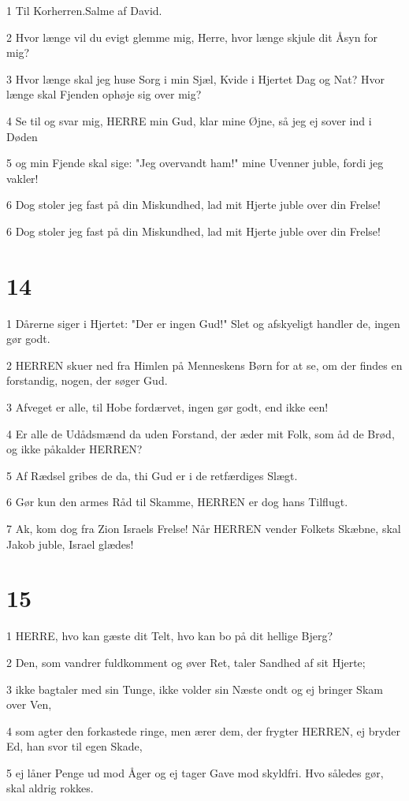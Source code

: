 \par 1 Til Korherren.Salme af David.
\par 2 Hvor længe vil du evigt glemme mig, Herre, hvor længe skjule dit Åsyn for mig?
\par 3 Hvor længe skal jeg huse Sorg i min Sjæl, Kvide i Hjertet Dag og Nat? Hvor længe skal Fjenden ophøje sig over mig?
\par 4 Se til og svar mig, HERRE min Gud, klar mine Øjne, så jeg ej sover ind i Døden
\par 5 og min Fjende skal sige: "Jeg overvandt ham!" mine Uvenner juble, fordi jeg vakler!
\par 6 Dog stoler jeg fast på din Miskundhed, lad mit Hjerte juble over din Frelse!
\par 6 Dog stoler jeg fast på din Miskundhed, lad mit Hjerte juble over din Frelse!

\chapter{14}

\par 1 Dårerne siger i Hjertet: "Der er ingen Gud!" Slet og afskyeligt handler de, ingen gør godt.
\par 2 HERREN skuer ned fra Himlen på Menneskens Børn for at se, om der findes en forstandig, nogen, der søger Gud.
\par 3 Afveget er alle, til Hobe fordærvet, ingen gør godt, end ikke een!
\par 4 Er alle de Udådsmænd da uden Forstand, der æder mit Folk, som åd de Brød, og ikke påkalder HERREN?
\par 5 Af Rædsel gribes de da, thi Gud er i de retfærdiges Slægt.
\par 6 Gør kun den armes Råd til Skamme, HERREN er dog hans Tilflugt.
\par 7 Ak, kom dog fra Zion Israels Frelse! Når HERREN vender Folkets Skæbne, skal Jakob juble, Israel glædes!

\chapter{15}

\par 1 HERRE, hvo kan gæste dit Telt, hvo kan bo på dit hellige Bjerg?
\par 2 Den, som vandrer fuldkomment og øver Ret, taler Sandhed af sit Hjerte;
\par 3 ikke bagtaler med sin Tunge, ikke volder sin Næste ondt og ej bringer Skam over Ven,
\par 4 som agter den forkastede ringe, men ærer dem, der frygter HERREN, ej bryder Ed, han svor til egen Skade,
\par 5 ej låner Penge ud mod Åger og ej tager Gave mod skyldfri. Hvo således gør, skal aldrig rokkes.

